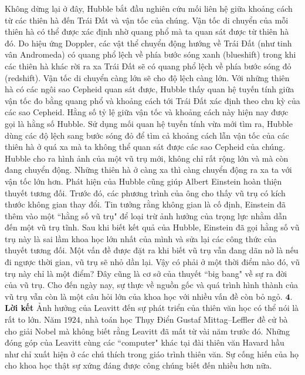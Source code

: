 \begin{multicols}{2}
	Không dừng lại ở đây, Hubble bắt đầu nghiên cứu mối liên hệ giữa khoảng cách từ các thiên hà đến Trái Đất và vận tốc của chúng. Vận tốc di chuyển của mỗi thiên hà có thể được xác định nhờ quang phổ mà ta quan sát được từ thiên hà đó. Do hiệu ứng Doppler, các vật thể chuyển động hướng về Trái Đất (như tinh vân Andromeda) có quang phổ lệch về phía bước sóng xanh (blueshift) trong khi các thiên hà khác rời ra xa Trái Đất sẽ có quang phổ lệch về phía bước sóng đỏ (redshift). Vận tốc di chuyển càng lớn sẽ cho độ lệch càng lớn. Với những thiên hà có các ngôi sao Cepheid quan sát được, Hubble thấy quan hệ tuyến tính giữa vận tốc đo bằng quang phổ và khoảng cách tới Trái Đất xác định theo chu kỳ của các sao Cepheid. Hằng số tỷ lệ giữa vận tốc và khoảng cách này hiện nay được gọi là hằng số Hubble. Sử dụng mối quan hệ tuyến tính vừa mới tìm ra, Hubble dùng các độ lệch sang bước sóng đỏ để tìm cả khoảng cách lẫn vận tốc của các thiên hà ở quá xa mà ta không thể quan sát được các sao Cepheid của chúng. Hubble cho ra hình ảnh của một vũ trụ mới, không chỉ rất rộng lớn và mà còn đang chuyển động. Những thiên hà ở càng xa thì càng chuyển động ra xa ta với vận tốc lớn hơn. Phát hiện của Hubble cũng giúp Albert Einstein hoàn thiện thuyết tương đối. Trước đó, các phương trình của ông cho thấy vũ trụ có kích thước không gian thay đổi. Tin tưởng rằng không gian là cố định, Einstein đã thêm vào một ``hằng số vũ trụ"  để loại trừ ảnh hưởng của trọng lực nhằm dẫn đến một vũ trụ tĩnh. Sau khi biết kết quả của Hubble, Einstein đã gọi hằng số vũ trụ này là sai lầm khoa học lớn nhất của mình và sửa lại các công thức của thuyết tương đối.
	\vskip 0.1cm
	Một vấn đề được đặt ra khi biết vũ trụ vẫn đang dãn nở là nếu đi ngược thời gian, vũ trụ sẽ nhỏ dần lại. Vậy có phải ở một thời điểm nào đó, vũ trụ này chỉ là một điểm?  Đây cũng là cơ sở của thuyết ``big bang" về sự ra đời của vũ trụ. Cho đến ngày nay, sự thực về nguồn gốc và quá trình hình thành của vũ trụ vẫn còn là một câu hỏi lớn của khoa học với nhiều vấn đề còn bỏ ngỏ.
	\vskip 0.1cm
	$\pmb{4.}$ \textbf{\color{timhieukhoahoc}Lời kết}
	\vskip 0.1cm
	Ảnh hưởng của Leavitt đến sự phát triển của thiên văn học có thể nói là rất to lớn. Năm $1924$, nhà toán học Thụy Điển  Gustaf Mittag--Leffler đề cử bà cho giải Nobel mà không biết rằng Leavitt đã mất từ vài năm trước đó. Những đóng góp của Leavitt cùng các ``computer" khác tại đài thiên văn Havard hầu như chỉ xuất hiện ở các chú thích trong giáo trình thiên văn. Sự cống hiến của họ cho khoa học thật sự xứng đáng được công chúng biết đến nhiều hơn nữa.
	\begin{figure}[H]

\end{figure}
\end{multicols}
